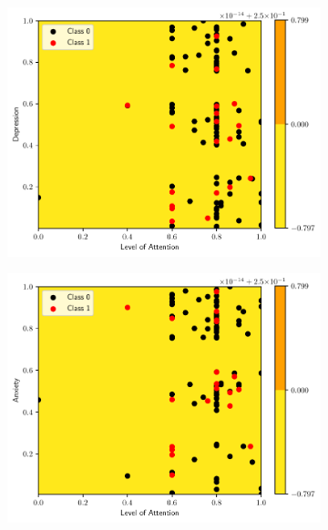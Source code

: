 \documentclass[conference]{IEEEtran}
\theoremstyle{definition}
\theoremstyle{remark}
\theoremstyle{remark}
\begin{document}
\begin{figure}
    \centering
    \begin{subfigure}[b]{0.32\textwidth}
        \centering
        \includegraphics[width=\textwidth]{figs/tree-contour-0-3.pdf}
        \caption{}
    \end{subfigure}
    \begin{subfigure}[b]{0.32\textwidth}
        \centering
        \includegraphics[width=\textwidth]{figs/tree-contour-0-4.pdf}
        \caption{}
    \end{subfigure}
    \begin{subfigure}[b]{0.32\textwidth}

\end{subfigure}
\end{figure}
\end{document}

